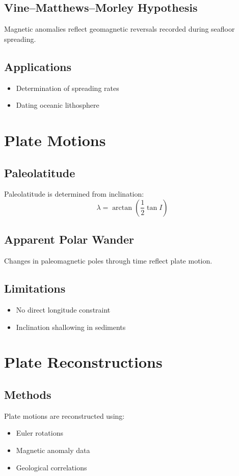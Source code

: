 \subsection{Vine--Matthews--Morley Hypothesis}
Magnetic anomalies reflect geomagnetic reversals recorded during seafloor spreading.

\subsection{Applications}
\begin{itemize}
\item Determination of spreading rates
\item Dating oceanic lithosphere
\end{itemize}

\section{Plate Motions}

\subsection{Paleolatitude}
Paleolatitude is determined from inclination:
\begin{equation}
\lambda = \arctan\left(\frac{1}{2}\tan I\right)
\end{equation}

\subsection{Apparent Polar Wander}
Changes in paleomagnetic poles through time reflect plate motion.

\subsection{Limitations}
\begin{itemize}
\item No direct longitude constraint
\item Inclination shallowing in sediments
\end{itemize}

\section{Plate Reconstructions}

\subsection{Methods}
Plate motions are reconstructed using:
\begin{itemize}
\item Euler rotations
\item Magnetic anomaly data
\item Geological correlations
\end{itemize}

